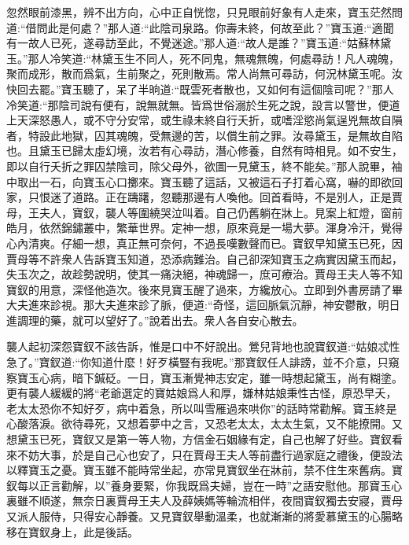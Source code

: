 \begin{parag}
    忽然眼前漆黑，辨不出方向，心中正自恍惚，只見眼前好象有人走來，寶玉茫然問道:“借問此是何處？”那人道:“此陰司泉路。你壽未終，何故至此？”寶玉道:“適聞有一故人已死，遂尋訪至此，不覺迷途。”那人道:“故人是誰？”寶玉道:“姑蘇林黛玉。”那人冷笑道:“林黛玉生不同人，死不同鬼，無魂無魄，何處尋訪！凡人魂魄，聚而成形，散而爲氣，生前聚之，死則散焉。常人尚無可尋訪，何況林黛玉呢。汝快回去罷。”寶玉聽了，呆了半晌道:“既雲死者散也，又如何有這個陰司呢？”那人冷笑道:“那陰司說有便有，說無就無。皆爲世俗溺於生死之說，設言以警世，便道上天深怒愚人，或不守分安常，或生祿未終自行夭折，或嗜淫慾尚氣逞兇無故自隕者，特設此地獄，囚其魂魄，受無邊的苦，以償生前之罪。汝尋黛玉，是無故自陷也。且黛玉已歸太虛幻境，汝若有心尋訪，潛心修養，自然有時相見。如不安生，即以自行夭折之罪囚禁陰司，除父母外，欲圖一見黛玉，終不能矣。”那人說畢，袖中取出一石，向寶玉心口擲來。寶玉聽了這話，又被這石子打着心窩，嚇的即欲回家，只恨迷了道路。正在躊躇，忽聽那邊有人喚他。回首看時，不是別人，正是賈母，王夫人，寶釵，襲人等圍繞哭泣叫着。自己仍舊躺在牀上。見案上紅燈，窗前皓月，依然錦鏽叢中，繁華世界。定神一想，原來竟是一場大夢。渾身冷汗，覺得心內清爽。仔細一想，真正無可奈何，不過長嘆數聲而已。寶釵早知黛玉已死，因賈母等不許衆人告訴寶玉知道，恐添病難治。自己卻深知寶玉之病實因黛玉而起，失玉次之，故趁勢說明，使其一痛決絕，神魂歸一，庶可療治。賈母王夫人等不知寶釵的用意，深怪他造次。後來見寶玉醒了過來，方纔放心。立即到外書房請了畢大夫進來診視。那大夫進來診了脈，便道:“奇怪，這回脈氣沉靜，神安鬱散，明日進調理的藥，就可以望好了。”說着出去。衆人各自安心散去。
\end{parag}


\begin{parag}
    襲人起初深怨寶釵不該告訴，惟是口中不好說出。鶯兒背地也說寶釵道:“姑娘忒性急了。”寶釵道:“你知道什麼！好歹橫豎有我呢。”那寶釵任人誹謗，並不介意，只窺察寶玉心病，暗下鍼砭。一日，寶玉漸覺神志安定，雖一時想起黛玉，尚有糊塗。更有襲人緩緩的將“老爺選定的寶姑娘爲人和厚，嫌林姑娘秉性古怪，原恐早夭，老太太恐你不知好歹，病中着急，所以叫雪雁過來哄你”的話時常勸解。寶玉終是心酸落淚。欲待尋死，又想着夢中之言，又恐老太太，太太生氣，又不能撩開。又想黛玉已死，寶釵又是第一等人物，方信金石姻緣有定，自己也解了好些。寶釵看來不妨大事，於是自己心也安了，只在賈母王夫人等前盡行過家庭之禮後，便設法以釋寶玉之憂。寶玉雖不能時常坐起，亦常見寶釵坐在牀前，禁不住生來舊病。寶釵每以正言勸解，以”養身要緊，你我既爲夫婦，豈在一時”之語安慰他。那寶玉心裏雖不順遂，無奈日裏賈母王夫人及薛姨媽等輪流相伴，夜間寶釵獨去安寢，賈母又派人服侍，只得安心靜養。又見寶釵舉動溫柔，也就漸漸的將愛慕黛玉的心腸略移在寶釵身上，此是後話。
\end{parag}



